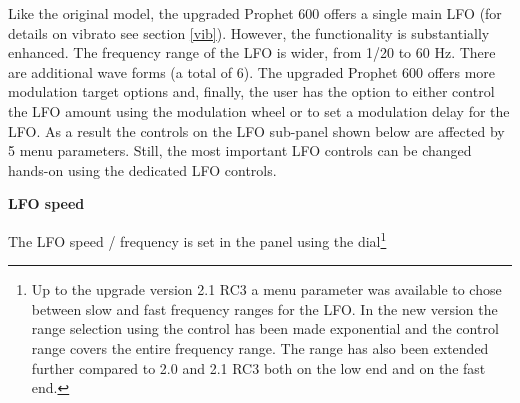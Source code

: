 Like the original model, the upgraded Prophet 600 offers a single main LFO (for details on vibrato see section \ref{vib}). However, the functionality is substantially enhanced. The frequency range of the LFO is wider, from 1/20 to 60 Hz. There are additional wave forms (a total of 6). The upgraded Prophet 600 offers more modulation target options and, finally, the user has the option to either control the LFO amount using the modulation wheel or to set a modulation delay for the LFO. As a result the controls on the LFO sub-panel shown below are affected by 5 menu parameters. Still, the most important LFO controls can be changed hands-on using the dedicated LFO controls. 


\begin{center}
\end{center}

\textbf{LFO speed}

The LFO speed / frequency is set in the panel using the \lfofreq dial\footnote{Up to the upgrade version 2.1 RC3 a menu parameter was available to chose between slow and fast frequency ranges for the LFO. In the new version the range selection using the \lfofreq control has been made exponential and the control range covers the entire frequency range. The range has also been extended further compared to 2.0 and 2.1 RC3 both on the low end and on the fast end.} 

